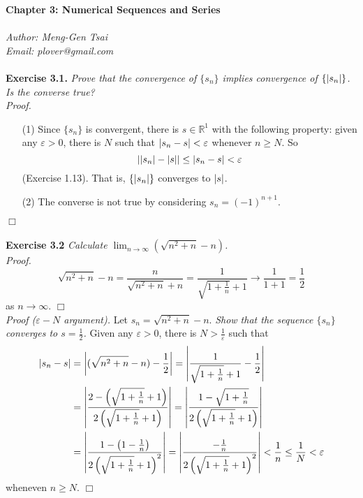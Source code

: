 \documentclass{article}
\begin{document}
\textbf{\Large Chapter 3: Numerical Sequences and Series} \\\\



\emph{Author: Meng-Gen Tsai} \\
\emph{Email: plover@gmail.com} \\\\



\textbf{Exercise 3.1.}
\emph{Prove that the convergence of $\{s_n\}$ implies
convergence of $\{\abs{s_n}\}$.  Is the converse true?} \\

\emph{Proof.}
\begin{enumerate}
\item[(1)]
Since $\{s_n\}$ is convergent, there is $s \in \mathbb{R}^1$
with the following property:
given any $\varepsilon > 0$, there is $N$ such that
$\abs{s_n - s} < \varepsilon$ whenever $n \geq N$.
So
$$\abs{\abs{s_n}-\abs{s}} \leq \abs{s_n - s}  < \varepsilon$$
(Exercise 1.13). That is,
$\{\abs{s_n}\}$ converges to $\abs{s}$.
\item[(2)]
The converse is not true by considering $s_n = (-1)^{n+1}$.
\end{enumerate}
$\Box$ \\\\






\textbf{Exercise 3.2}
\emph{Calculate $\lim_{n \to \infty}(\sqrt{n^2 + n} - n)$.} \\

\emph{Proof.}
$$\sqrt{n^2 + n} - n
= \frac{n}{\sqrt{n^2+n} + n}
= \frac{1}{\sqrt{1+\frac{1}{n}} + 1} \to \frac{1}{1+1} = \frac{1}{2}$$
as $n \to \infty$.
$\Box$ \\

\emph{Proof ($\varepsilon-N$ argument).}
Let $s_n = \sqrt{n^2 + n} - n$.
\emph{Show that the sequence $\{s_n\}$ converges to $s = \frac{1}{2}$.}
Given any $\varepsilon > 0$, there is $N > \frac{1}{\varepsilon}$ such that
\begin{align*}
\abs{s_n - s}
&= \abs{(\sqrt{n^2 + n} - n) - \frac{1}{2}}
= \abs{\frac{1}{\sqrt{1+\frac{1}{n}} + 1} - \frac{1}{2}} \\
&= \abs{
\frac{2-\left(\sqrt{1+\frac{1}{n}} + 1\right)}
{2\left(\sqrt{1+\frac{1}{n}} + 1\right)}
}
= \abs{
\frac{1-\sqrt{1+\frac{1}{n}}}
{2\left(\sqrt{1+\frac{1}{n}} + 1\right)}
} \\
&= \abs{
\frac{1 - \left(1- \frac{1}{n}\right)}
{2\left(\sqrt{1+\frac{1}{n}} + 1\right)^2}}
= \abs{
\frac{- \frac{1}{n}}
{2\left(\sqrt{1+\frac{1}{n}} + 1\right)^2}}
< \frac{1}{n}
\leq \frac{1}{N}
< \varepsilon
\end{align*}
wheneven $n \geq N$.
$\Box$ \\\\
\end{document}
